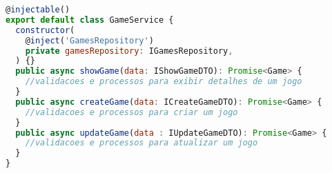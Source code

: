 \begin{lstlisting}[language=JavaScript, caption={Implementação que viola o SRP},captionpos=b, label=alg:gameservice]
@injectable()
export default class GameService {
  constructor(
    @inject('GamesRepository')
    private gamesRepository: IGamesRepository,
  ) {}
  public async showGame(data: IShowGameDTO): Promise<Game> {
    //validacoes e processos para exibir detalhes de um jogo
  }
  public async createGame(data: ICreateGameDTO): Promise<Game> {
    //validacoes e processos para criar um jogo
  }
  public async updateGame(data : IUpdateGameDTO): Promise<Game> {
    //validacoes e processos para atualizar um jogo
  }
}
\end{lstlisting}